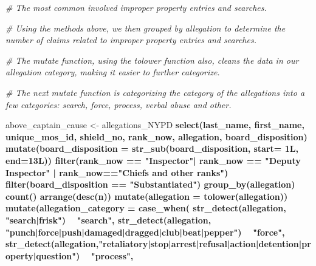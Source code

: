 \documentclass[
]{article}
\newenvironment{Shaded}{\begin{snugshade}}{\end{snugshade}}
\newcommand{\CommentTok}[1]{\textcolor[rgb]{0.56,0.35,0.01}{\textit{#1}}}
\newcommand{\DataTypeTok}[1]{\textcolor[rgb]{0.13,0.29,0.53}{#1}}
\newcommand{\KeywordTok}[1]{\textcolor[rgb]{0.13,0.29,0.53}{\textbf{#1}}}
\newcommand{\NormalTok}[1]{#1}
\newcommand{\OperatorTok}[1]{\textcolor[rgb]{0.81,0.36,0.00}{\textbf{#1}}}
\newcommand{\StringTok}[1]{\textcolor[rgb]{0.31,0.60,0.02}{#1}}
\begin{document}
\begin{Shaded}
\begin{Highlighting}[]
\CommentTok{#  The most common involved improper property entries and searches.}

\CommentTok{#  Using the methods above, we then grouped by allegation to determine the number of claims related to improper property entries and searches.}

\CommentTok{#  The mutate function, using the tolower function also, cleans the data in our allegation category, making it easier to further categorize.}

\CommentTok{#  The next mutate function is categorizing the category of the allegations into a few categories: search, force, process, verbal abuse and other.}

\NormalTok{above_captain_cause <-}\StringTok{ }\NormalTok{allegations_NYPD }\OperatorTok{%>%}
\StringTok{  }\KeywordTok{select}\NormalTok{(last_name, first_name, unique_mos_id, shield_no, rank_now, allegation, board_disposition) }\OperatorTok{%>%}
\StringTok{  }\KeywordTok{mutate}\NormalTok{(}\DataTypeTok{board_disposition =} \KeywordTok{str_sub}\NormalTok{(board_disposition, }\DataTypeTok{start=}\NormalTok{ 1L, }\DataTypeTok{end=}\NormalTok{13L)) }\OperatorTok{%>%}
\StringTok{  }\KeywordTok{filter}\NormalTok{(rank_now }\OperatorTok{==}\StringTok{ "Inspector"}\OperatorTok{|}\StringTok{ }\NormalTok{rank_now }\OperatorTok{==}\StringTok{ "Deputy Inspector"} \OperatorTok{|}\StringTok{ }\NormalTok{rank_now}\OperatorTok{==}\StringTok{"Chiefs and other ranks"}\NormalTok{) }\OperatorTok{%>%}
\StringTok{  }\KeywordTok{filter}\NormalTok{(board_disposition }\OperatorTok{==}\StringTok{ "Substantiated"}\NormalTok{) }\OperatorTok{%>%}
\StringTok{  }\KeywordTok{group_by}\NormalTok{(allegation) }\OperatorTok{%>%}
\StringTok{  }\KeywordTok{count}\NormalTok{() }\OperatorTok{%>%}
\StringTok{  }\KeywordTok{arrange}\NormalTok{(}\KeywordTok{desc}\NormalTok{(n)) }\OperatorTok{%>%}
\StringTok{  }\KeywordTok{mutate}\NormalTok{(}\DataTypeTok{allegation =} \KeywordTok{tolower}\NormalTok{(allegation)) }\OperatorTok{%>%}
\StringTok{  }\KeywordTok{mutate}\NormalTok{(}\DataTypeTok{allegation_category =} \KeywordTok{case_when}\NormalTok{(}
    \KeywordTok{str_detect}\NormalTok{(allegation, }\StringTok{"search|frisk"}\NormalTok{) }\OperatorTok{~}\StringTok{ "search"}\NormalTok{,}
    \KeywordTok{str_detect}\NormalTok{(allegation, }\StringTok{"punch|force|push|damaged|dragged|club|beat|pepper"}\NormalTok{) }\OperatorTok{~}\StringTok{ "force"}\NormalTok{,}
    \KeywordTok{str_detect}\NormalTok{(allegation,}\StringTok{"retaliatory|stop|arrest|refusal|action|detention|property|question"}\NormalTok{) }\OperatorTok{~}\StringTok{ "process"}\NormalTok{,}
}}}}}}}}}
\end{Highlighting}
\end{Shaded}
\end{document}
